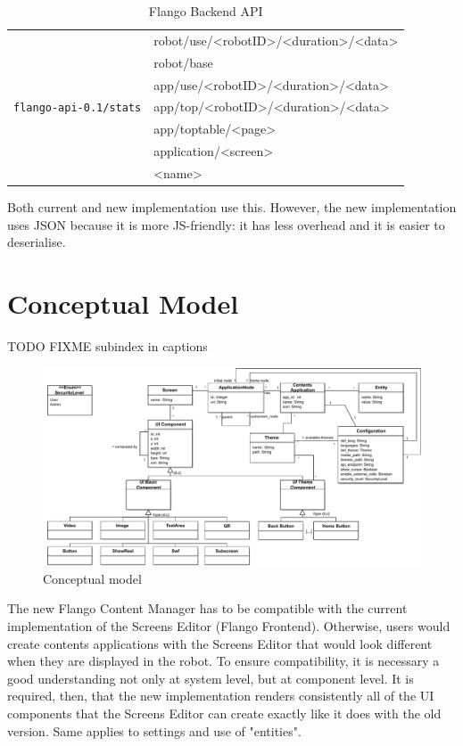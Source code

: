 \begin{table}[ht]
\begin{tabularx}{\linewidth}{| l | X |}
    \multirow{7}{*}{\texttt{flango-api-0.1/stats}}
        & robot/use/\textless robotID>/\textless duration\textgreater/<data\textgreater \\
        & robot/base \\
        & app/use/\textless robotID\textgreater/\textless duration\textgreater/<data\textgreater \\
        & app/top/\textless robotID\textgreater/\textless duration\textgreater/<data\textgreater \\
        & app/toptable/\textless page\textgreater \\
        & application/\textless screen\textgreater \\
        & <name> \\
    \hline
    \end{tabularx}
    \caption{Flango Backend API}
    \label{tab:flango-api}
\end{table}
Both current and new implementation use this.
However, the new implementation uses \ac{JSON} because it is more \ac{JS}-friendly: it has less overhead and it is easier to deserialise.


\section{Conceptual Model}
TODO FIXME subindex in captions
\begin{figure}   
    \centering
    \includegraphics[width=\textwidth]{figures/specification-conceptual-model}
    \caption{Conceptual model}
    \label{fig:specification-conceptual-model}
\end{figure}

The new Flango Content Manager has to be compatible with the current implementation of the Screens Editor (Flango Frontend).
Otherwise, users would create contents applications with the Screens Editor that would look different when they are displayed in the robot.
To ensure compatibility, it is necessary a good understanding not only at system level, but at component level.
It is required, then, that the new implementation renders consistently all of the \ac{UI} components that the Screens Editor can create exactly like it does with the old version. 
Same applies to settings and use of "entities".

